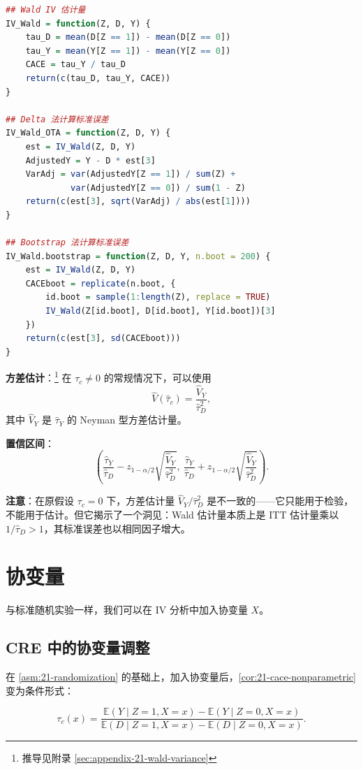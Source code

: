 \begin{lstlisting}[language=R]
## Wald IV 估计量
IV_Wald = function(Z, D, Y) {
    tau_D = mean(D[Z == 1]) - mean(D[Z == 0])
    tau_Y = mean(Y[Z == 1]) - mean(Y[Z == 0])
    CACE = tau_Y / tau_D
    return(c(tau_D, tau_Y, CACE))
}

## Delta 法计算标准误差
IV_Wald_OTA = function(Z, D, Y) {
    est = IV_Wald(Z, D, Y)
    AdjustedY = Y - D * est[3]
    VarAdj = var(AdjustedY[Z == 1]) / sum(Z) +
             var(AdjustedY[Z == 0]) / sum(1 - Z)
    return(c(est[3], sqrt(VarAdj) / abs(est[1])))
}

## Bootstrap 法计算标准误差
IV_Wald.bootstrap = function(Z, D, Y, n.boot = 200) {
    est = IV_Wald(Z, D, Y)
    CACEboot = replicate(n.boot, {
        id.boot = sample(1:length(Z), replace = TRUE)
        IV_Wald(Z[id.boot], D[id.boot], Y[id.boot])[3]
    })
    return(c(est[3], sd(CACEboot)))
}
\end{lstlisting}

\textbf{方差估计}：\footnote{推导见附录 \cref{sec:appendix-21-wald-variance}}
在 $\tau_c \neq 0$ 的常规情况下，可以使用
\[
\hat{V}(\hat{\tau}_c) = \frac{\hat{V}_Y}{\hat{\tau}_D^2},
\]
其中 $\hat{V}_Y$ 是 $\hat{\tau}_Y$ 的 Neyman 型方差估计量。

\textbf{置信区间}：
\[
\left( \frac{\hat{\tau}_Y}{\hat{\tau}_D} - z_{1-\alpha/2} \sqrt{\frac{\hat{V}_Y}{\hat{\tau}_D^2}},\ \frac{\hat{\tau}_Y}{\hat{\tau}_D} + z_{1-\alpha/2} \sqrt{\frac{\hat{V}_Y}{\hat{\tau}_D^2}} \right).
\]

\textbf{注意}：在原假设 $\tau_c = 0$ 下，方差估计量 $\hat{V}_Y / \hat{\tau}_D^2$ 是不一致的——它只能用于检验，不能用于估计。但它揭示了一个洞见：Wald 估计量本质上是 ITT 估计量乘以 $1/\hat{\tau}_D > 1$，其标准误差也以相同因子增大。

\section{协变量}
\label{sec:21-covariates}

与标准随机实验一样，我们可以在 IV 分析中加入协变量 $X$。

\subsection{CRE 中的协变量调整}

在 \cref{asm:21-randomization} 的基础上，加入协变量后，\cref{cor:21-cace-nonparametric} 变为条件形式：

\begin{equation}
\tau_c(x) = \frac{\mathbb{E}(Y \mid Z = 1, X = x) - \mathbb{E}(Y \mid Z = 0, X = x)}{\mathbb{E}(D \mid Z = 1, X = x) - \mathbb{E}(D \mid Z = 0, X = x)}.
\label{eq:21-cace-with-covariates}
\end{equation}

